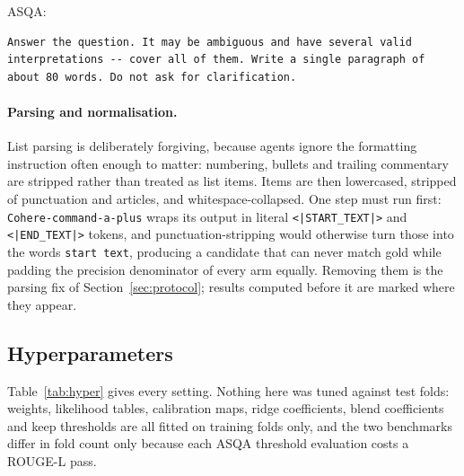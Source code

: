 \documentclass{article}
\begin{document}
ASQA:
\begin{verbatim}
Answer the question. It may be ambiguous and have several valid
interpretations -- cover all of them. Write a single paragraph of
about 80 words. Do not ask for clarification.
\end{verbatim}

\paragraph{Parsing and normalisation.}
List parsing is deliberately forgiving, because agents ignore the formatting instruction often enough to matter: numbering, bullets and trailing commentary are stripped rather than treated as list items. Items are then lowercased, stripped of punctuation and articles, and whitespace-collapsed. One step must run first: \texttt{Cohere-command-a-plus} wraps its output in literal \verb+<|START_TEXT|>+ and \verb+<|END_TEXT|>+ tokens, and punctuation-stripping would otherwise turn those into the words \texttt{start text}, producing a candidate that can never match gold while padding the precision denominator of every arm equally. Removing them is the parsing fix of Section~\ref{sec:protocol}; results computed before it are marked where they appear.

\subsection{Hyperparameters}
\label{app:hyper}

Table~\ref{tab:hyper} gives every setting. Nothing here was tuned against test folds: weights, likelihood tables, calibration maps, ridge coefficients, blend coefficients and keep thresholds are all fitted on training folds only, and the two benchmarks differ in fold count only because each ASQA threshold evaluation costs a ROUGE-L pass.
\end{document}
